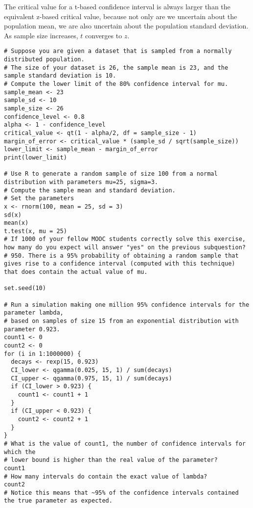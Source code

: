 The critical value for a t-based confidence interval is always larger than the equivalent z-based critical value, because not only are we uncertain about the population mean, we are also uncertain about the population standard deviation. As sample size increases, $t$ converges to $z$.

\begin{verbatim}
# Suppose you are given a dataset that is sampled from a normally distributed population.
# The size of your dataset is 26, the sample mean is 23, and the sample standard deviation is 10.
# Compute the lower limit of the 80% confidence interval for mu.
sample_mean <- 23
sample_sd <- 10
sample_size <- 26
confidence_level <- 0.8
alpha <- 1 - confidence_level
critical_value <- qt(1 - alpha/2, df = sample_size - 1)
margin_of_error <- critical_value * (sample_sd / sqrt(sample_size))
lower_limit <- sample_mean - margin_of_error
print(lower_limit)

# Use R to generate a random sample of size 100 from a normal distribution with parameters mu=25, sigma=3.
# Compute the sample mean and standard deviation.
# Set the parameters
x <- rnorm(100, mean = 25, sd = 3)
sd(x)
mean(x)
t.test(x, mu = 25)
# If 1000 of your fellow MOOC students correctly solve this exercise, how many do you expect will answer "yes" on the previous subquestion?
# 950. There is a 95% probability of obtaining a random sample that gives rise to a confidence interval (computed with this technique) that does contain the actual value of mu.

set.seed(10)

# Run a simulation making one million 95% confidence intervals for the parameter lambda,
# based on samples of size 15 from an exponential distribution with parameter 0.923.
count1 <- 0
count2 <- 0
for (i in 1:1000000) {
  decays <- rexp(15, 0.923)
  CI_lower <- qgamma(0.025, 15, 1) / sum(decays)
  CI_upper <- qgamma(0.975, 15, 1) / sum(decays)
  if (CI_lower > 0.923) {
    count1 <- count1 + 1
  }
  if (CI_upper < 0.923) {
    count2 <- count2 + 1
  }
}
# What is the value of count1, the number of confidence intervals for which the
# lower bound is higher than the real value of the parameter?
count1
# How many intervals do contain the exact value of lambda?
count2
# Notice this means that ~95% of the confidence intervals contained the true parameter as expected.

\end{verbatim}
